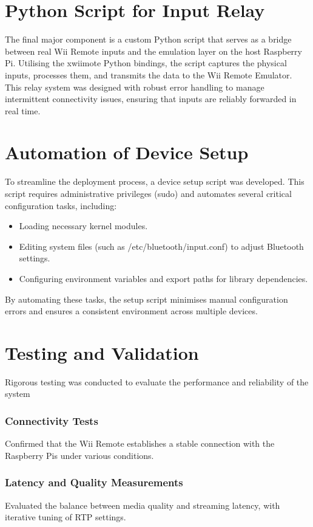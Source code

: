 \section{Python Script for Input Relay}
The final major component is a custom Python script that serves as a bridge between real Wii Remote inputs and the emulation layer on the host Raspberry Pi. Utilising the xwiimote Python bindings, the script captures the physical inputs, processes them, and transmits the data to the Wii Remote Emulator. This relay system was designed with robust error handling to manage intermittent connectivity issues, ensuring that inputs are reliably forwarded in real time.

\section{Automation of Device Setup}

To streamline the deployment process, a device setup script was developed. This script requires administrative privileges (sudo) and automates several critical configuration tasks, including:

\begin{itemize}

	\item Loading necessary kernel modules.
	\item Editing system files (such as /etc/bluetooth/input.conf) to adjust Bluetooth settings.
	\item Configuring environment variables and export paths for library dependencies.
\end{itemize}

By automating these tasks, the setup script minimises manual configuration errors and ensures a consistent environment across multiple devices.

\section{Testing and Validation}
Rigorous testing was conducted to evaluate the performance and reliability of the system

\subsubsection{Connectivity Tests}
Confirmed that the Wii Remote establishes a stable connection with the Raspberry Pis under various conditions.

\subsubsection{Latency and Quality Measurements}
Evaluated the balance between media quality and streaming latency, with iterative tuning of RTP settings.

